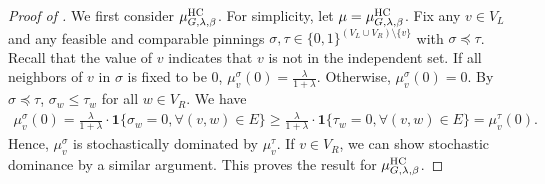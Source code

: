 \documentclass[11pt,a4paper]{article}
\theoremstyle{definition}
\def\*#1{\mathbf{#1}} %
\begin{document}
    \begin{proof}[Proof of ]
    We first consider $\mu_{G,\lambda,\beta}^{\textnormal{HC}}$.
    For simplicity, let $\mu = \mu_{G,\lambda,\beta}^{\textnormal{HC}}$.
    Fix any $v\in V_L$ and any feasible and comparable pinnings $\sigma,\tau\in \{0,1\}^{(V_L\cup V_R)\setminus \{v\}}$ with $\sigma\preceq\tau$. 
    Recall that the value of $v$ indicates that $v$ is not in the independent set.
    If all neighbors of $v$ in $\sigma$ is fixed to be 0, $\mu_{v}^{\sigma}(0)=\frac{\lambda}{1+\lambda}$. Otherwise, $\mu_{v}^{\sigma}(0)=0$. By $\sigma \preceq \tau$, $\sigma_w \leq \tau_w$ for all $w\in V_R$. We have
    \begin{align*}
        \mu_{v}^{\sigma}(0) = \frac{\lambda}{1+\lambda}\cdot\*1\{\sigma_w=0,\forall (v,w)\in E\} \geq \frac{\lambda}{1+\lambda}\cdot\*1\{\tau_w=0,\forall (v,w)\in E\}=\mu_{v}^{\tau}(0).
    \end{align*}
    Hence, $\mu_v^\sigma$ is stochastically dominated by $\mu_v^\tau$.
    If $v\in V_R$, we can show stochastic dominance by a similar argument. This proves the result for $ \mu_{G,\lambda,\beta}^{\textnormal{HC}}$.
    

\end{proof}
\end{document}
